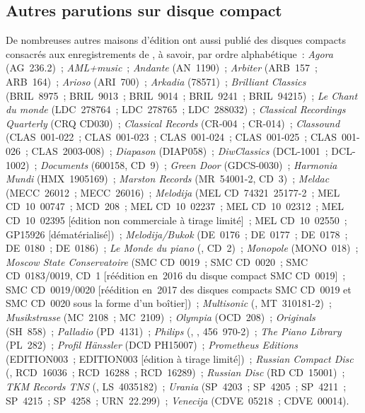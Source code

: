 \subsection{Autres parutions sur disque compact}

De nombreuses autres maisons d'édition ont aussi publié des disques compacts
consacrés aux enregistrements de \VSofronitsky{}, à savoir, par ordre
alphabétique~:
\emph{Agora} (AG~236.2)~;
\emph{AML+music}~;
\emph{Andante} (AN~1190)~;
\emph{Arbiter} (ARB~157~; ARB~164)~;
\emph{Arioso} (ARI~700)~;
\emph{Arkadia} (78571)~;
\emph{Brilliant Classics} (BRIL~8975~; BRIL~9013~; BRIL~9014~; BRIL~9241~;
BRIL~94215)~;
\emph{Le Chant du monde} (LDC~278764~; LDC~278765~; LDC~288032)~;
\emph{Classical Recordings Quarterly} (CRQ CD030)~;
\emph{Classical Records} (CR-004~; CR-014)~;
\emph{Classound} (CLAS~001-022~; CLAS~001-023~; CLAS~001-024~;
CLAS~001-025~; CLAS~001-026~; CLAS~2003-008)~;
\emph{Diapason} (DIAP058)~;
\emph{DiwClassics} (DCL-1001~; DCL-1002)~;
\emph{Documents} (600158, CD~9)~;
\emph{Green Door} (GDCS-0030)~;
\emph{Harmonia Mundi} (HMX~1905169)~;
\emph{Marston Records} (MR~\hbox{54001-2}, CD~3)~;
\emph{Meldac} (MECC~26012~; MECC~26016)~;
\emph{Melodija} (MEL CD~74321~25177-2~; MEL CD~10~00747~; MCD~208~;
MEL CD~10~02237~; MEL CD~10~02312~; MEL CD~10~02395 [édition non commerciale
à tirage limité]~; MEL CD~10~02550~; GP15926 [dématérialisé])~;
\emph{Melodija/Bukok} (DE~0176~; DE~0177~; DE~0178~; DE~0180~; DE~0186)~;
\emph{Le Monde du piano} (, CD~2)~;
\emph{Monopole} (MONO~018)~;
\emph{Moscow State Conservatoire} (SMC CD~0019~; SMC CD~0020~; SMC
CD~0183/0019, CD~1 [réédition en~2016 du disque compact SMC CD~0019]~; SMC
CD~0019/0020 [réédition en~2017 des disques compacts SMC CD~0019 et SMC
CD~0020 sous la forme d'un boîtier])~;
\emph{Multisonic} (, MT~310181-2)~;
\emph{Musikstrasse} (MC~2108~; MC~2109)~;
\emph{Olympia} (OCD~208)~;
\emph{Originals} (SH~858)~;
\emph{Palladio} (PD~4131)~;
\emph{Philips} (, ,
456~970-2)~;
\emph{The Piano Library} (PL~282)~;
\emph{Profil Hänssler} (DCD PH15007)~;
\emph{Prometheus Editions} (EDITION003~; EDITION003\OneHalf{} [édition à
tirage limité])~;
\emph{Russian Compact Disc} (, RCD~16036~; RCD~16288~; RCD~16289)~;
\emph{Russian Disc} (RD CD~15001)~;
\emph{TKM Records TNS} (, LS~4035182)~;
\emph{Urania} (SP~4203~; SP~4205~; SP~4211~; SP~4215~; SP~4258~;
URN~22.299)~;
\emph{Venecija} (CDVE~05218~; CDVE~00014).

